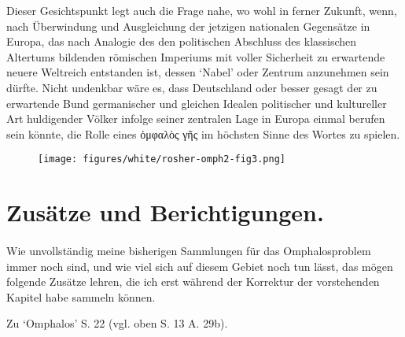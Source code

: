 \documentclass[a4paper, 11pt, oneside]{article}
\begin{document}
Dieser Gesichtspunkt legt auch die Frage nahe, wo wohl in ferner Zukunft, wenn, nach Überwindung und Ausgleichung der jetzigen nationalen Gegensätze in Europa, das nach Analogie des den politischen Abschluss des klassischen Altertums bildenden römischen Imperiums mit voller Sicherheit zu erwartende neuere Weltreich entstanden ist, dessen `Nabel' oder Zentrum anzunehmen sein dürfte. Nicht undenkbar wäre es, dass Deutschland oder besser gesagt der zu erwartende Bund germanischer und gleichen Idealen politischer und kultureller Art huldigender Völker infolge seiner zentralen Lage in Europa einmal berufen sein könnte, die Rolle eines ὀμφαλὸς γῆς im höchsten Sinne des Wortes zu spielen.
\begin{figure}[H]
\centering
\texttt{[image: figures/white/rosher-omph2-fig3.png]}
\caption{}
\end{figure}
\clearpage
\section{Zusätze und Berichtigungen.}
\paragraph{}
Wie unvollständig meine bisherigen Sammlungen für das Omphalosproblem immer noch sind, und wie viel sich auf diesem Gebiet noch tun lässt, das mögen folgende Zusätze lehren, die ich erst während der Korrektur der vorstehenden Kapitel habe sammeln können.

Zu `Omphalos' S. 22 (vgl. oben S. 13 A. 29b).
\end{document}

